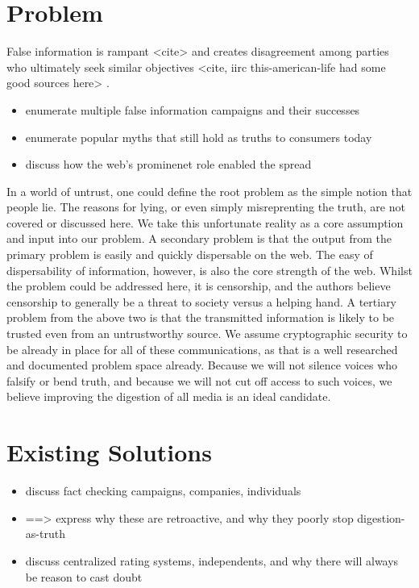 \documentclass{paper}
\begin{document}
\section{Problem}

False information is rampant <cite> and creates disagreement among parties who
ultimately seek similar objectives <cite, iirc this-american-life had some good sources here> \cite{peoplepress2016}.
\begin{itemize}
  \item enumerate multiple false information campaigns and their successes
  \item enumerate popular myths that still hold as truths to consumers today
  \item discuss how the web's prominenet role enabled the spread
\end{itemize}

In a world of untrust, one could define the root problem as the simple notion
that people lie.  The reasons for lying, or even simply misreprenting the
truth, are not covered or discussed here.  We take this unfortunate reality as
a core assumption and input into our problem.  A secondary problem is that the
output from the primary problem is easily and quickly dispersable on the web.
The easy of dispersability of information, however, is also the core strength of
the web.  Whilst the problem could be addressed here, it is censorship, and the
authors believe censorship to generally be a threat to society versus a helping
hand.  A tertiary problem from the above two is that the transmitted information
is likely to be trusted even from an untrustworthy source.  We assume
cryptographic security to be already in place for all of these communications,
as that is a well researched and documented problem space already.  Because we
will not silence voices who falsify or bend truth, and because we will not
cut off access to such voices, we believe improving the digestion of all
media is an ideal candidate.

\section{Existing Solutions}

\begin{itemize}
  \item discuss fact checking campaigns, companies, individuals
  \item ==> express why these are retroactive, and why they poorly stop digestion-as-truth
  \item discuss centralized rating systems, independents, and why there will always be reason to cast doubt
\end{itemize}
\end{document}

